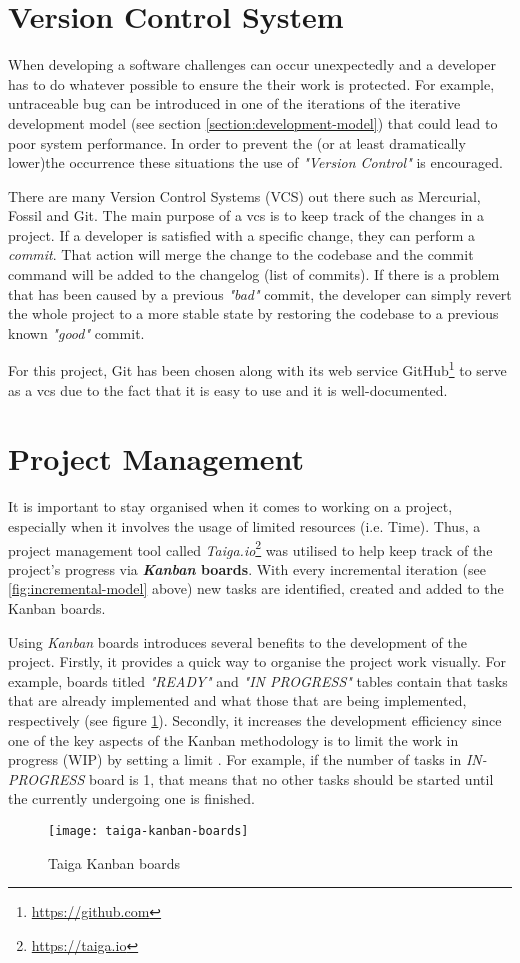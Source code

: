 \section{Version Control System}
When developing a software challenges can occur unexpectedly and a developer has to do whatever possible to ensure the their work is protected. For example, untraceable bug can be introduced in one of the iterations of the iterative development model (see section \ref{section:development-model}) that could lead to poor system performance. In order to prevent the (or at least dramatically lower)the occurrence these situations the use of \textit{"Version Control"} is encouraged.

There are many Version Control Systems (VCS) out there such as Mercurial, Fossil and Git. The main purpose of a \gls{vcs} is to keep track of the changes in a project. If a developer is satisfied with a specific change, they can perform a \textit{commit}. That action will merge the change to the codebase and the commit command will be added to the changelog (list of commits). If there is a problem that has been caused by a previous \textit{"bad"} commit, the developer can simply revert the whole project to a more stable state by restoring the codebase to a previous known \textit{"good"} commit.

For this project, Git has been chosen along with its web service GitHub\footnote{\url{https://github.com}} to serve as a \gls{vcs} due to the fact that it is easy to use and it is well-documented.


\section{Project Management}
It is important to stay organised when it comes to working on a project, especially when it involves the usage of limited resources (i.e. Time). Thus, a project management tool called \textit{Taiga.io}\footnote{\url{https://taiga.io}} was utilised to help keep track of the project's progress via \textbf{\textit{Kanban} boards}. With every incremental iteration (see \ref{fig:incremental-model} above) new tasks are identified, created and added to the Kanban boards.

Using \textit{Kanban} boards introduces several benefits to the development of the project. Firstly, it provides a quick way to organise the project work visually. For example, boards titled \textit{"READY"} and \textit{"IN PROGRESS"} tables contain that tasks that are already implemented and what those that are being implemented, respectively (see figure \ref{fig:taiga-kanban-boards}). Secondly, it increases the development efficiency since one of the key aspects of the Kanban methodology is to limit the work in progress (WIP) by setting a limit \citep[]{atlassian2017}. For example, if the number of tasks in \textit{IN-PROGRESS} board is 1, that means that no other tasks should be started until the currently undergoing one is finished.

\begin{figure}[ht]
    \centering
    \texttt{[image: taiga-kanban-boards]}
    \caption{Taiga Kanban boards}
    \label{fig:taiga-kanban-boards}
\end{figure}
